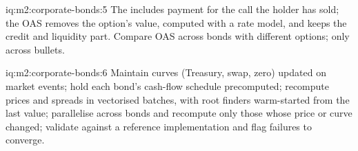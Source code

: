 \begin{solution}{iq:m2:corporate-bonds:5}
The  includes payment for the call the holder has sold; the OAS removes the
option's value, computed with a rate model, and keeps the credit and liquidity part.
Compare OAS across bonds with different options;  only across bullets.
\end{solution}

\begin{solution}{iq:m2:corporate-bonds:6}
Maintain curves (Treasury, swap, zero) updated on market events; hold each bond's
cash-flow schedule precomputed; recompute prices and spreads in vectorised batches,
with root finders warm-started from the last value; parallelise across bonds and
recompute only those whose price or curve changed; validate against a reference
implementation and flag failures to converge.
\end{solution}
